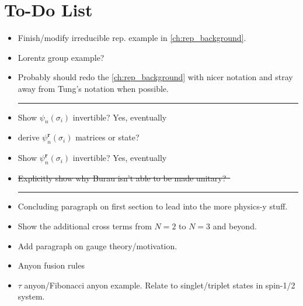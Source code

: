 \chapter{To-Do List}\label{ch:todo}

\begin{itemize}
    \item Finish/modify irreducible rep. example in \cref{ch:rep_background}.
    \item Lorentz group example?
    \item Probably should redo the \cref{ch:rep_background} with nicer notation and stray away from Tung's notation when possible.
    
    \begin{center}\rule{.85\textwidth}{0.65pt}\end{center}
    
    \item Show $\psi_n(\sigma_i)$ invertible? Yes, eventually
    \item derive $\psi_n^\textbf{r}(\sigma_i)$ matrices or state?
    \item Show $\psi_n^\textbf{r}(\sigma_i)$ invertible? Yes, eventually
    \item \sout{Explicitly show why Burau isn't able to be made unitary?~\cite{Delaney2016}}
    
    \begin{center}\rule{.85\textwidth}{0.65pt}\end{center}
    
    \item Concluding paragraph on first section to lead into the more physics-y stuff.
    \item Show the additional cross terms from $N=2$ to $N=3$ and beyond.
    \item Add paragraph on gauge theory/motivation.
    \item Anyon fusion rules
    \item $\tau$ anyon/Fibonacci anyon example. Relate to singlet/triplet states in spin-1/2 system.
\end{itemize}
